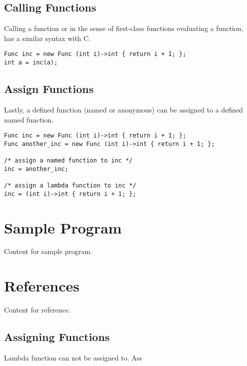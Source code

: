 \documentclass[11pt,A4]{article}
\begin{document}

        
        
\subsection{Calling Functions}
Calling a function or in the sense of first-class functions evaluating a function, has a similar syntax with C.
\begin{lstlisting}
Func inc = new Func (int i)->int { return i + 1; };
int a = inc(a);
\end{lstlisting}

\subsection{Assign Functions}
Lastly, a defined function (named or anonymous) can be assigned to a defined named function.

\begin{lstlisting}
Func inc = new Func (int i)->int { return i + 1; };
Func another_inc = new Func (int i)->int { return i + 1; };

/* assign a named function to inc */
inc = another_inc;

/* assign a lambda function to inc */
inc = (int i)->int { return i + 1; };

\end{lstlisting}
        
        

    \newpage
    \section{Sample Program}
    Content for sample program.

    \newpage
    \section{References}
    Content for reference.

\subsection{Assigning Functions}
Lambda function can not be assigned to. Ass
    
\end{document}
